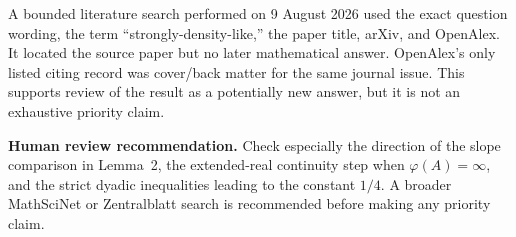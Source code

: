 \documentclass[11pt]{article}
\begin{document}
A bounded literature search performed on 9 August 2026 used the exact question wording, the term ``strongly-density-like,'' the paper title, arXiv, and OpenAlex. It located the source paper but no later mathematical answer. OpenAlex's only listed citing record was cover/back matter for the same journal issue. This supports review of the result as a potentially new answer, but it is not an exhaustive priority claim.

\medskip
\noindent\textbf{Human review recommendation.} Check especially the direction of the slope comparison in Lemma~2, the extended-real continuity step when $\varphi(A)=\infty$, and the strict dyadic inequalities leading to the constant $1/4$. A broader MathSciNet or Zentralblatt search is recommended before making any priority claim.
\end{document}
